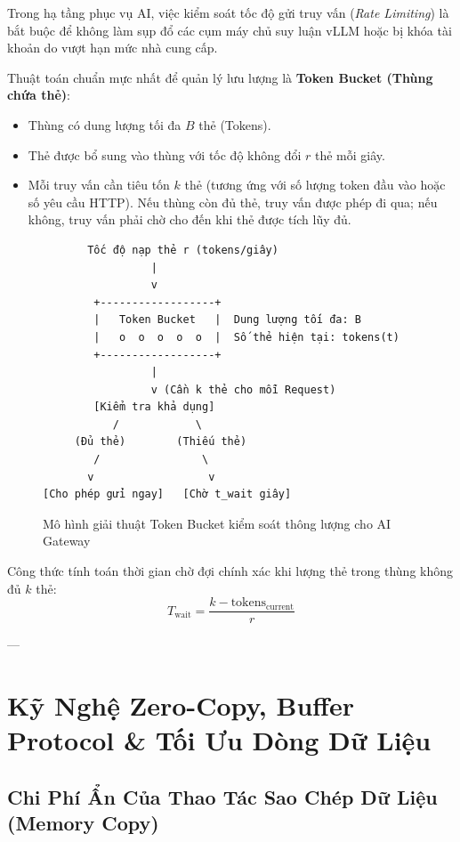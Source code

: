 Trong hạ tầng phục vụ AI, việc kiểm soát tốc độ gửi truy vấn (\textit{Rate Limiting}) là bắt buộc để không làm sụp đổ các cụm máy chủ suy luận vLLM hoặc bị khóa tài khoản do vượt hạn mức nhà cung cấp.

Thuật toán chuẩn mực nhất để quản lý lưu lượng là \textbf{Token Bucket (Thùng chứa thẻ)}:
\begin{itemize}
  \item Thùng có dung lượng tối đa $B$ thẻ (Tokens).
  \item Thẻ được bổ sung vào thùng với tốc độ không đổi $r$ thẻ mỗi giây.
  \item Mỗi truy vấn cần tiêu tốn $k$ thẻ (tương ứng với số lượng token đầu vào hoặc số yêu cầu HTTP). Nếu thùng còn đủ thẻ, truy vấn được phép đi qua; nếu không, truy vấn phải chờ cho đến khi thẻ được tích lũy đủ.
\end{itemize}

\begin{figure}[htbp]
\centering
\small
\begin{verbatim}
       Tốc độ nạp thẻ r (tokens/giây)
                 |
                 v
        +------------------+
        |   Token Bucket   |  Dung lượng tối đa: B
        |   o  o  o  o  o  |  Số thẻ hiện tại: tokens(t)
        +------------------+
                 |
                 v (Cần k thẻ cho mỗi Request)
        [Kiểm tra khả dụng]
           /            \
     (Đủ thẻ)        (Thiếu thẻ)
        /                \
       v                  v
[Cho phép gửi ngay]   [Chờ t_wait giây]
\end{verbatim}
\caption{Mô hình giải thuật Token Bucket kiểm soát thông lượng cho AI Gateway}
\label{fig:token-bucket-flow}
\end{figure}

Công thức tính toán thời gian chờ đợi chính xác khi lượng thẻ trong thùng không đủ $k$ thẻ:
\begin{equation}
T_{\text{wait}} = \frac{k - \text{tokens}_{\text{current}}}{r}
\label{eq:token-bucket-wait}
\end{equation}

---

\section{Kỹ Nghệ Zero-Copy, Buffer Protocol \& Tối Ưu Dòng Dữ Liệu}
\label{sec:zero-copy-memoryview}

\subsection{Chi Phí Ẩn Của Thao Tác Sao Chép Dữ Liệu (Memory Copy)}

